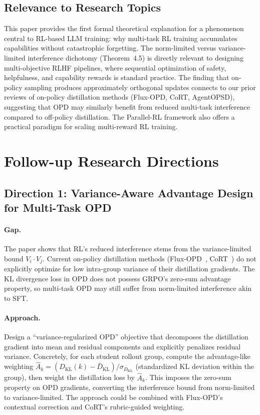 \documentclass[11pt,a4paper]{article}
\begin{document}
\subsection{Relevance to Research Topics}

This paper provides the first formal theoretical explanation for a phenomenon central to RL-based LLM training: why multi-task RL training accumulates capabilities without catastrophic forgetting. The norm-limited versus variance-limited interference dichotomy (Theorem~4.5) is directly relevant to designing multi-objective RLHF pipelines, where sequential optimization of safety, helpfulness, and capability rewards is standard practice. The finding that on-policy sampling produces approximately orthogonal updates connects to our prior reviews of on-policy distillation methods (Flux-OPD, CoRT, AgentOPSD), suggesting that OPD may similarly benefit from reduced multi-task interference compared to off-policy distillation. The Parallel-RL framework also offers a practical paradigm for scaling multi-reward RL training.

\section{Follow-up Research Directions}

\subsection{Direction 1: Variance-Aware Advantage Design for Multi-Task OPD}

\paragraph{Gap.} The paper shows that RL's reduced interference stems from the variance-limited bound $V_i \cdot V_j$. Current on-policy distillation methods (Flux-OPD~\cite{flux2026opd}, CoRT~\cite{cort2026}) do not explicitly optimize for low intra-group variance of their distillation gradients. The KL divergence loss in OPD does not possess GRPO's zero-sum advantage property, so multi-task OPD may still suffer from norm-limited interference akin to SFT.

\paragraph{Approach.} Design a ``variance-regularized OPD'' objective that decomposes the distillation gradient into mean and residual components and explicitly penalizes residual variance. Concretely, for each student rollout group, compute the advantage-like weighting $\hat{A}_k = (D_{\text{KL}}(k) - \bar{D}_{\text{KL}}) / \sigma_{D_{\text{KL}}}$ (standardized KL deviation within the group), then weight the distillation loss by $\hat{A}_k$. This imposes the zero-sum property on OPD gradients, converting the interference bound from norm-limited to variance-limited. The approach could be combined with Flux-OPD's contextual correction and CoRT's rubric-guided weighting.
\end{document}
